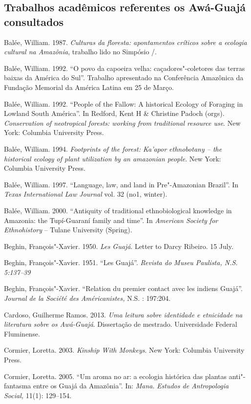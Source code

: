 \begin{Parskip}
\section{Trabalhos acadêmicos referentes os Awá-Guajá consultados}

Balée, William. 1987. \emph{Culturas da floresta: apontamentos críticos
sobre a ecologia cultural na Amazônia}, trabalho lido no Simpósio
/.

Balée, William. 1992. ``O povo da capoeira velha: caçadores"-coletores
das terras baixas da América do Sul''. Trabalho apresentado na
Conferência Amazônica da Fundação Memorial da América Latina em 25 de
Março.

Balée, William. 1992. ``People of the Fallow: A historical Ecology of
Foraging in Lowland South América''. In Redford, Kent H \& Christine
Padoch (orgs). \emph{Conservation of neotropical forests: working from
traditional resource use}. New York: Columbia University Press.

Balée, William. 1994. \emph{Footprints of the forest: Ka'apor
ethnobotany -- the historical ecology of plant utilization by an
amazonian people}. New York: Columbia University Press.

Balée, William. 1997. ``Language, law, and land in Pre"-Amazonian
Brazil''. In \emph{Texas International Law Journal} vol. 32 (no1,
winter).

Balée, William. 2000. ``Antiquity of traditional ethnobiological
knowledge in Amazonia: the Tupí-Guaraní family and time''. In
\emph{American Society for Ethnohistory} -- Tulane University (Spring).

Beghin, François"-Xavier. 1950. \emph{Les Guajá}. Letter to Darcy
Ribeiro. 15 July.

Beghin, François"-Xavier. 1951. ``Les Guajá''. \emph{Revista do Museu
Paulista, N.S. 5:137--39}

Beghin, François"-Xavier. ``Relation du premier contact avec les indiens
Guajá''. \emph{Journal de la Société des Américanistes,} N.S. :
197:204.

Cardoso, Guilherme Ramos. 2013. \emph{Uma leitura sobre identidade e
etnicidade na literatura sobre os Awá-Guajá}. Dissertação de mestrado.
Universidade Federal Fluminense.

Cormier, Loretta. 2003. \emph{Kinship With Monkeys}. New York: Columbia
University Press.

Cormier, Loretta. 2005. ``Um aroma no ar: a ecologia histórica das
plantas anti"-fantasma entre os Guajá da Amazônia''. In: \emph{Mana}.
\emph{Estudos de Antropologia Social,} 11(1): 129--154.


\end{Parskip}
